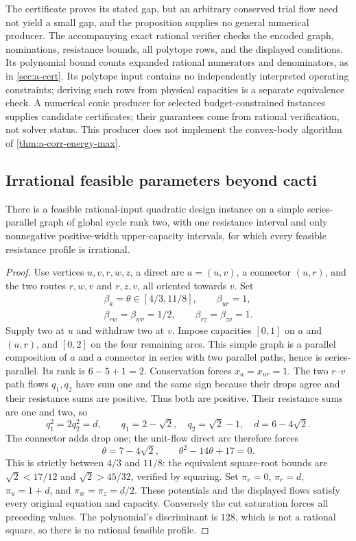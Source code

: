 The certificate proves its stated gap, but an arbitrary conserved trial
flow need not yield a small gap, and the proposition supplies no general
numerical producer. The accompanying exact rational verifier checks the
encoded graph, nominations, resistance bounds, all polytope rows, and
the displayed conditions. Its polynomial bound counts expanded rational
numerators and denominators, as in \cref{sec:a-cert}. Its polytope
input contains no independently interpreted operating constraints;
deriving such rows from physical capacities is a separate equivalence
check. A numerical conic producer for selected budget-constrained
instances supplies candidate certificates; their guarantees come from
rational verification, not solver status. This producer does not
implement the convex-body algorithm of \cref{thm:a-corr-energy-max}.

\subsection{Irrational feasible parameters beyond cacti}

\begin{proposition}
\label{prop:a-corr-irrational}
There is a feasible rational-input quadratic design instance on a simple
series-parallel graph of global cycle rank two, with one resistance
interval and only nonnegative positive-width upper-capacity intervals,
for which every feasible resistance profile is irrational.
\end{proposition}
\begin{proof}
Use vertices $u,v,r,w,z$, a direct arc $a=(u,v)$, a connector $(u,r)$,
and the two routes $r,w,v$ and $r,z,v$, all oriented towards $v$. Set
\[
 \begin{gathered}
 \beta_a=\theta\in[4/3,11/8],\qquad \beta_{ur}=1,\\
 \beta_{rw}=\beta_{wv}=1/2,\qquad
 \beta_{rz}=\beta_{zv}=1.
 \end{gathered}
\]
Supply two at $u$ and withdraw two at $v$. Impose capacities $[0,1]$
on $a$ and $(u,r)$, and $[0,2]$ on the four remaining arcs. This simple
graph is a parallel composition of $a$ and a connector in series with
two parallel paths, hence is series-parallel. Its rank is $6-5+1=2$.
Conservation forces $x_a=x_{ur}=1$. The two $r$--$v$ path flows
$q_1,q_2$ have sum one and the same sign because their drops agree and
their resistance sums are positive. Thus both are positive. Their
resistance sums are one and two, so
\[
 q_1^2=2q_2^2=d,\qquad
 q_1=2-\sqrt2,\quad q_2=\sqrt2-1,\quad d=6-4\sqrt2.
\]
The connector adds drop one; the unit-flow direct arc therefore forces
\[
 \theta=7-4\sqrt2,\qquad \theta^2-14\theta+17=0.
\]
This is strictly between $4/3$ and $11/8$: the equivalent square-root
bounds are $\sqrt2<17/12$ and $\sqrt2>45/32$, verified by squaring.
Set $\pi_v=0$, $\pi_r=d$, $\pi_u=1+d$, and
$\pi_w=\pi_z=d/2$. These potentials and the displayed flows satisfy
every original equation and capacity. Conversely the cut saturation
forces all preceding values. The polynomial's discriminant is $128$,
which is not a rational square, so there is no rational feasible profile.
\end{proof}

